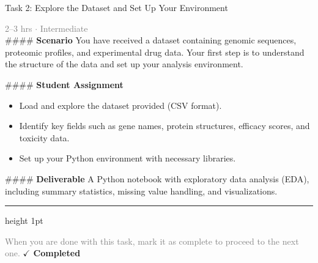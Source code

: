 \documentclass[10pt,a4paper]{article}
\begin{document}
\begin{taskbox}{Task 2: Explore the Dataset and Set Up Your Environment}

    {\small \textcolor{gray}{2--3 hrs $\cdot$ Intermediate}}\\[12pt]

    \#\#\#\# \textbf{Scenario}
You have received a dataset containing genomic sequences, proteomic profiles, and experimental drug data. Your first step is to understand the structure of the data and set up your analysis environment.

\#\#\#\# \textbf{Student Assignment}
\begin{itemize}
    \item Load and explore the dataset provided (CSV format).
    \item Identify key fields such as gene names, protein structures, efficacy scores, and toxicity data.
    \item Set up your Python environment with necessary libraries.
\end{itemize}

\#\#\#\# \textbf{Deliverable}
A Python notebook with exploratory data analysis (EDA), including summary statistics, missing value handling, and visualizations.\par

    \vspace{16pt}

    \textcolor{cardBorder}{\hrule height 1pt}\vspace{8pt}

    \small \textcolor{gray}{When you are done with this task, mark it as complete to proceed to the next one.} \hfill \textbf{\textcolor{brandDark}{$\checkmark$ Completed}}

\end{taskbox}
\end{document}
